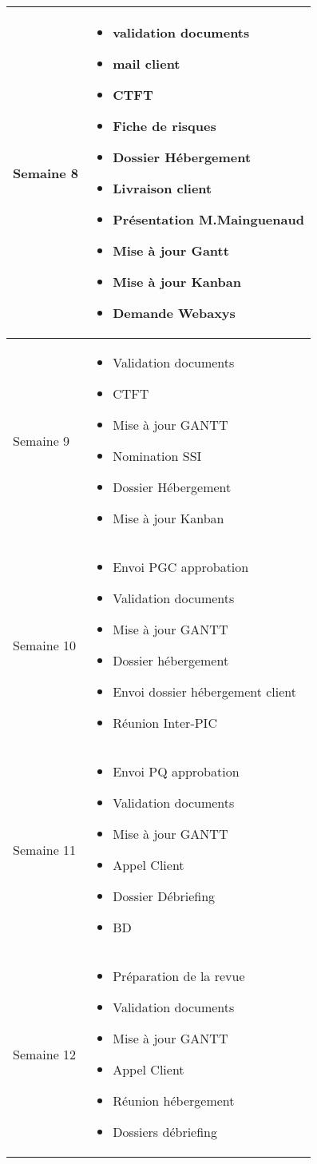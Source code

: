\documentclass [a4paper] {article}
\begin{document}
\begin{longtable}{|>{\columncolor{gray!40}}p{2cm}|p{12cm}|}
	\hline
	Semaine 8 & \begin{itemize}
		\item validation documents
		\item mail client
		\item CTFT
		\item Fiche de risques
		\item Dossier Hébergement
		\item Livraison client
		\item Présentation M.Mainguenaud
		\item Mise à jour Gantt
		\item Mise à jour Kanban
		\item Demande Webaxys
	\end{itemize} \\
	\hline
	Semaine 9 & \begin{itemize}
		\item Validation documents
		\item CTFT
		\item Mise à jour GANTT
		\item Nomination SSI
		\item Dossier Hébergement
		\item Mise à jour Kanban
	\end{itemize} \\
	\hline
	Semaine 10 & \begin{itemize}
		\item Envoi PGC approbation
		\item Validation documents
		\item Mise à jour GANTT
		\item Dossier hébergement
		\item Envoi dossier hébergement client
		\item Réunion Inter-PIC
	\end{itemize} \\
	\hline
	Semaine 11 & \begin{itemize}
		\item Envoi PQ approbation
		\item Validation documents
		\item Mise à jour GANTT
		\item Appel Client
		\item Dossier Débriefing
		\item BD
	\end{itemize} \\
	\hline
	Semaine 12 & \begin{itemize}
		\item Préparation de la revue
		\item Validation documents
		\item Mise à jour GANTT
		\item Appel Client
		\item Réunion hébergement
		\item Dossiers débriefing
	\end{itemize} \\
	\hline
	
	
\end{longtable}
\end{document}

